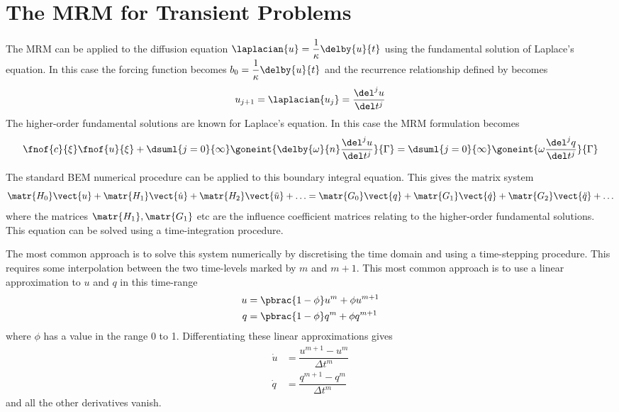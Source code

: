 \section{The MRM for Transient Problems}

The MRM can be applied
to the diffusion equation $\laplacian{u} = \dfrac{1}{\kappa} \delby{u}{t}$
using the fundamental solution of Laplace's equation.  In this case the
forcing function becomes $b_{0} = \dfrac{1}{\kappa} \delby{u}{t}$ and the
recurrence relationship defined by  becomes
\begin{equation}
u_{j+1} = \laplacian{u_{j}} = \dfrac{\del^{j} u}{\del t^{j}}
\end{equation}
The higher-order fundamental solutions are known for Laplace's equation.
In this case the MRM formulation becomes
\begin{equation}
  \fnof{c}{\xi} \fnof{u}{\xi} + \dsuml{j=0}{\infty}
  \goneint{\delby{\omega}{n} \dfrac{\del^{j} u}{\del t^{j}}}{\Gamma} =
  \dsuml{j=0}{\infty} \goneint{\omega \dfrac{\del^{j} q}{\del t^{j}}}{\Gamma}
\end{equation}

The standard BEM numerical procedure can be applied to this boundary
integral equation.  This gives the matrix system
\begin{equation}
  \matr{H_{0}} \vect{u} + \matr{H_{1}} \vect{\dot{u}} + \matr{H_{2}}
  \vect{\ddot{u}} + \ldots = \matr{G_{0}} \vect{q} + \matr{G_{1}} \vect{\dot{q}} +
  \matr{G_{2}} \vect{\ddot{q}} + \ldots
\label{eq:infsystem}
\end{equation}
where the matrices $\matr{H_{1}},\matr{G_{1}}$ etc are the influence
coefficient matrices relating to the higher-order fundamental solutions.
This equation can be solved using a time-integration procedure.

The most common approach is to solve this system numerically by
discretising the time domain and using a time-stepping procedure.  This
requires some interpolation between the two time-levels marked by $m$ and
$m+1$.  This most common approach is to use a linear approximation to
$u$ and $q$ in this time-range
\begin{align}
u & = \pbrac{1 - \phi} u^{m} + \phi u^{m+1} \\
q & = \pbrac{1 - \phi} q^{m} + \phi q^{m+1}
\end{align}
where $\phi$ has a value in the range 0 to 1.  Differentiating these linear
approximations gives
\begin{align}
\dot{u} & = \dfrac{u^{m+1} - u^{m}}{\Delta t^{m}} \\
\dot{q} & = \dfrac{q^{m+1} - q^{m}}{\Delta t^{m}}
\end{align}
and all the other derivatives vanish.

